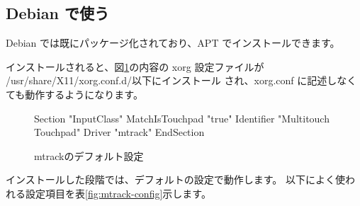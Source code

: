 \documentclass[mingoth,a4paper]{jsarticle}
\begin{document}
\subsection{Debian で使う}
Debian では既にパッケージ化されており、APT でインストールできます。


インストールされると、図\ref{fig:mtrack-default}の内容の
xorg 設定ファイルが /usr/share/X11/xorg.conf.d/以下にインストール
され、xorg.conf に記述しなくても動作するようになります。

\begin{figure}[h]
\begin{commandline}
Section "InputClass"
    MatchIsTouchpad "true"
    Identifier "Multitouch Touchpad"
    Driver "mtrack"
EndSection
\end{commandline} 
\caption{mtrackのデフォルト設定}
\label{fig:mtrack-default}
\end{figure}

インストールした段階では、デフォルトの設定で動作します。
以下によく使われる設定項目を表\ref{fig:mtrack-config}示します。
\end{document}
